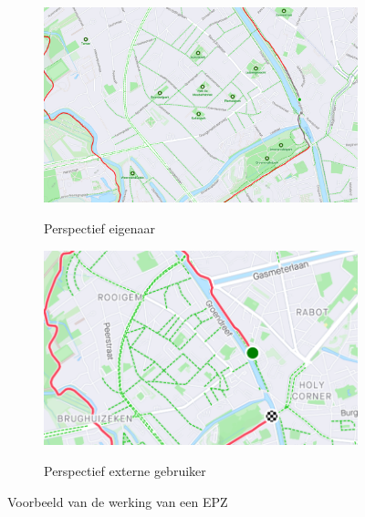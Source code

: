 \begin{figure}[h]
    \centering
    \begin{subfigure}[b]{.7\textwidth}
        \centering
        \caption{Perspectief eigenaar}
        \includegraphics[width=1\textwidth]{fig/EPZ-mechanisme/Example_EPZ_InternalView.png}\label{fig:EPZ_internal}
    \end{subfigure}\hfill
    \begin{subfigure}[b]{.7\textwidth}
        \centering
        \caption{Perspectief externe gebruiker}
        \includegraphics[width=1\textwidth]{fig/EPZ-mechanisme/Example_EPZ_ExternalView.png}\label{fig:EPZ_external}
    \end{subfigure}
    \caption{Voorbeeld van de werking van een \ac{EPZ}}\label{fig:EPZ_Voorbeeld}
\end{figure}

